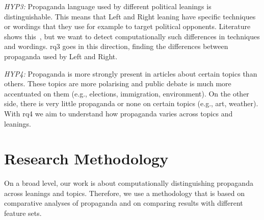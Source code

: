 \emph{HYP3:} Propaganda language used by different political leanings is distinguishable. This means that Left and Right leaning have specific techniques or wordings that they use for example to target political opponents. Literature shows this~\citep{blumberg1986comparative}, but we want to detect computationally such differences in techniques and wordings.
\acrshort{rq}3 goes in this direction, finding the differences between propaganda used by Left and Right.

\emph{HYP4:} Propaganda is more strongly present in articles about certain topics than others. These topics are more polarising and public debate is much more accentuated on them (e.g., elections, immigration, environment). On the other side, there is very little propaganda or none on certain topics (e.g., art, weather).
With \acrshort{rq}4 we aim to understand how propaganda varies across topics and leanings.




\section{\statusgreen Research Methodology}
\label{sec:intro_method}

On a broad level, our work is about computationally distinguishing propaganda across leanings and topics. Therefore, we use a methodology that is based on comparative analyses of propaganda and on comparing results with different feature sets.

